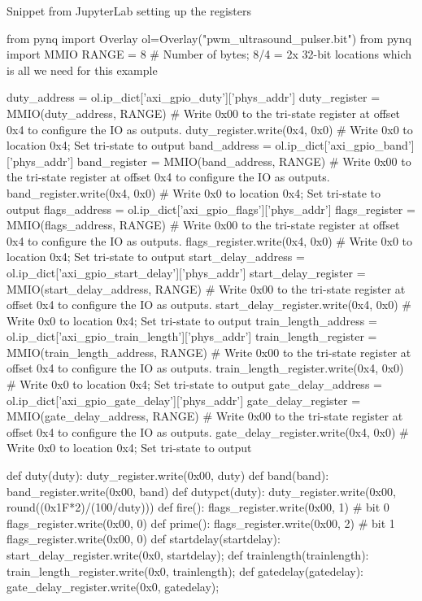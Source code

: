 \begin{listing}[htbp]
	\centering
	\caption{Snippet from JupyterLab setting up the registers}
	\label{lst:4_controlsystem_jupyter_registers}
	\begin{mintedpython}
from pynq import Overlay
ol=Overlay("pwm_ultrasound_pulser.bit")
from pynq import MMIO
RANGE = 8 # Number of bytes; 8/4 = 2x 32-bit locations which is all we need for this example

duty_address = ol.ip_dict['axi_gpio_duty']['phys_addr']
duty_register = MMIO(duty_address, RANGE)
# Write 0x00 to the tri-state register at offset 0x4 to configure the IO as outputs.
duty_register.write(0x4, 0x0) # Write 0x0 to location 0x4; Set tri-state to output
band_address = ol.ip_dict['axi_gpio_band']['phys_addr']
band_register = MMIO(band_address, RANGE)
# Write 0x00 to the tri-state register at offset 0x4 to configure the IO as outputs.
band_register.write(0x4, 0x0) # Write 0x0 to location 0x4; Set tri-state to output
flags_address = ol.ip_dict['axi_gpio_flags']['phys_addr']
flags_register = MMIO(flags_address, RANGE)
# Write 0x00 to the tri-state register at offset 0x4 to configure the IO as outputs.
flags_register.write(0x4, 0x0) # Write 0x0 to location 0x4; Set tri-state to output
start_delay_address = ol.ip_dict['axi_gpio_start_delay']['phys_addr']
start_delay_register = MMIO(start_delay_address, RANGE)
# Write 0x00 to the tri-state register at offset 0x4 to configure the IO as outputs.
start_delay_register.write(0x4, 0x0) # Write 0x0 to location 0x4; Set tri-state to output
train_length_address = ol.ip_dict['axi_gpio_train_length']['phys_addr']
train_length_register = MMIO(train_length_address, RANGE)
# Write 0x00 to the tri-state register at offset 0x4 to configure the IO as outputs.
train_length_register.write(0x4, 0x0) # Write 0x0 to location 0x4; Set tri-state to output
gate_delay_address = ol.ip_dict['axi_gpio_gate_delay']['phys_addr']
gate_delay_register = MMIO(gate_delay_address, RANGE)
# Write 0x00 to the tri-state register at offset 0x4 to configure the IO as outputs.
gate_delay_register.write(0x4, 0x0) # Write 0x0 to location 0x4; Set tri-state to output

def duty(duty):
	duty_register.write(0x00, duty)
def band(band):
	band_register.write(0x00, band)
def dutypct(duty):
	duty_register.write(0x00, round((0x1F*2)/(100/duty)))
def fire():
	flags_register.write(0x00, 1) # bit 0
	flags_register.write(0x00, 0)
def prime():
	flags_register.write(0x00, 2) # bit 1
	flags_register.write(0x00, 0)
def startdelay(startdelay):
	start_delay_register.write(0x0, startdelay);
def trainlength(trainlength):
	train_length_register.write(0x0, trainlength);
def gatedelay(gatedelay):
	gate_delay_register.write(0x0, gatedelay);
	\end{mintedpython}
\end{listing}
